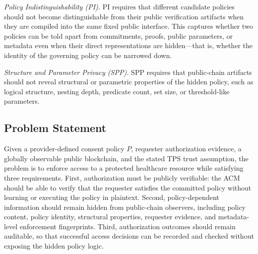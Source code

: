 \textit{Policy Indistinguishability (PI).}
PI requires that different candidate policies should not become distinguishable from their public verification artifacts when they are compiled into the same fixed public interface.
This captures whether two policies can be told apart from commitments, proofs, public
parameters, or metadata even when their direct representations are hidden---that is,
whether the identity of the governing policy can be narrowed down.

\textit{Structure and Parameter Privacy (SPP).}
SPP requires that public-chain artifacts should not reveal structural or parametric properties of the
hidden policy, such as logical structure, nesting depth, predicate count, set size, or threshold-like parameters.

\subsection{Problem Statement}

Given a provider-defined consent policy $P$, requester authorization evidence,
a globally observable public blockchain, and the stated TPS trust assumption, the problem is
to enforce access to a protected healthcare resource while satisfying three requirements.
First, authorization must be publicly verifiable: the ACM should be able to verify that the
requester satisfies the committed policy without learning or executing the policy in plaintext. Second, policy-dependent information should remain hidden from public-chain observers, including policy content, policy identity, structural properties, requester evidence, and metadata-level enforcement fingerprints.
Third, authorization outcomes should remain auditable, so that successful access decisions can be recorded and checked without exposing the hidden policy logic.
